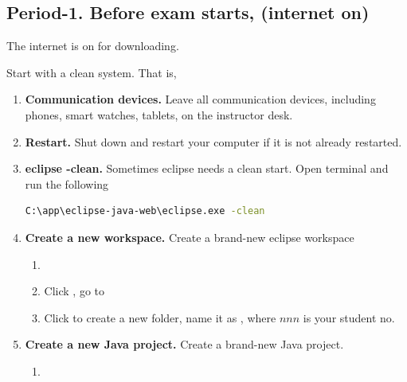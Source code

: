 \subsection{Period-1. Before exam starts, (internet on)}

The internet is on for downloading.

Start with a clean system. That is,

\begin{enumerate}[label=\roman*.]
	
	\item \textbf{Communication devices.}
	Leave all communication devices, including phones, smart watches,
	tablets, on the instructor desk.

	\item \textbf{Restart.} 
	Shut down and restart your computer if it is not already restarted.
	
	\item \textbf{eclipse -clean.} 
	Sometimes eclipse needs a clean start. 
	Open terminal and run the following

\begin{lstlisting}[style=codesnippet, language=bash]
C:\app\eclipse-java-web\eclipse.exe -clean
\end{lstlisting}

	
	\item \textbf{Create a new workspace.} 
	Create a brand-new eclipse workspace
	\begin{enumerate}[itemsep=1pt, topsep=1pt] 
		
		\item {}
	
		\item Click , go to 
	
		\item Click  to create a new folder, name it as , 
		where $nnn$ is your student no.
		
	\end{enumerate}

	
	\item \textbf{Create a new Java project.} 
	Create a brand-new Java project.
	\begin{enumerate}[itemsep=1pt, topsep=1pt] 
		
		\item {}
	

\end{enumerate}
\end{enumerate}
